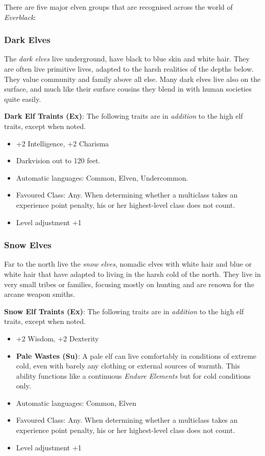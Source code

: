 There are five major elven groups that are recognised across the world of
\emph{Everblack}:

\subsubsection*{Dark Elves}

The \emph{dark elves} live underground, have black to blue skin and white
hair. They are often live primitive lives, adapted to the harsh realities of
the depths below. They value community and family above all else. Many dark
elves live also on the surface, and much like their surface cousins they blend
in with human societies quite easily.

\begin{35e}
  \textbf{Dark Elf Traints (Ex)}: The following traits are in \emph{addition}
  to the high elf traits, except when noted.
  \begin{itemize}[noitemsep]
    \item +2 Intelligence, +2 Charisma
    \item Darkvision out to 120 feet.
    \item Automatic languages: Common, Elven, Undercommon.
    \item Favoured Class: Any. When determining whether a multiclass takes an
    experience point penalty, his or her highest-level class does not count.
    \item Level adjustment +1
  \end{itemize}
\end{35e}

\subsubsection*{Snow Elves}

Far to the north live the \emph{snow elves}, nomadic elves with white hair and
blue or white hair that have adapted to living in the harsh cold of the north.
They live in very small tribes or families, focusing mostly on hunting and are
renown for the arcane weapon smiths.

\begin{35e}
  \textbf{Snow Elf Traints (Ex)}: The following traits are in \emph{addition}
  to the high elf traits, except when noted.
  \begin{itemize}[noitemsep]
    \item +2 Wisdom, +2 Dexterity
    \item \textbf{Pale Wastes (Su)}: A pale elf can live comfortably in
    conditions of extreme cold, even with barely any clothing or external
    sources of warmth. This ability functions like a continuous \emph{Endure
    Elements} but for cold conditions only.
    \item Automatic languages: Common, Elven
    \item Favoured Class: Any. When determining whether a multiclass takes an
    experience point penalty, his or her highest-level class does not count.
    \item Level adjustment +1
  \end{itemize}
\end{35e}

